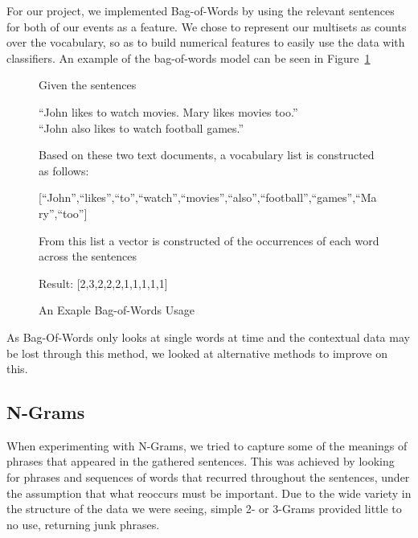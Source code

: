 \documentclass[bsc,frontabs,twoside,singlespacing,parskip,deptreport]{infthesis}     %
\begin{document}
For our project, we implemented Bag-of-Words by using the relevant sentences for both of our events as a feature.
We chose to represent our multisets as counts over the vocabulary, so as to build numerical features to easily
use the data with classifiers. An example of the bag-of-words model can be seen in Figure~\ref{fig:bow}
\begin{figure}
\begin{tcolorbox}[width=\textwidth,
                  interior hidden,
                  boxsep=10pt,
                  left=0pt,
                  right=0pt,
                  top=2pt,
                  ]%
  Given the sentences \vspace{0.5em}\\
  \begin{center}``John likes to watch movies. Mary likes movies too.''\\
  ``John also likes to watch football games.''\vspace{1em}\\
   \end{center}
    Based on these two text documents, a vocabulary list is constructed as follows:\vspace{1em}\\
    \begin{center}
  [``John'',``likes'',``to'',``watch'',``movies'',``also'',``football'',``games'',``Mary'',``too'']\vspace{1em}\\
\end{center}
    From this list a vector is constructed of the occurrences
    of each word across the sentences\vspace{1em}\\
 \begin{center} 
  Result: [2,3,2,2,2,1,1,1,1,1]
\end{center}
\end{tcolorbox}
\caption{An Exaple Bag-of-Words Usage}
\label{fig:bow}
\end{figure}

As Bag-Of-Words only looks at single words at time and the contextual data may be lost through this method, we looked at
alternative methods to improve on this.

\subsection{N-Grams}
When experimenting with N-Grams, we tried to capture some of the meanings of phrases that appeared in the gathered
sentences.
This was achieved by looking for phrases and sequences of words that recurred throughout the sentences, under the assumption
that what reoccurs must be important. Due to the wide variety in the structure of the data we were seeing,
simple 2- or 3-Grams provided little to no use, returning junk phrases.
\end{document}
